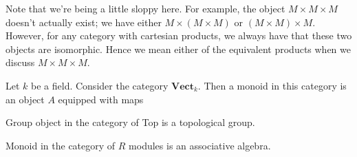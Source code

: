 \textcolor{NavyBlue}{Note that we're being a little sloppy here. For example, the object 
$M \times M \times M$ doesn't actually exist; we have either $M \times (M \times M)$ or $(M \times M) \times M$. 
} However, for any category with cartesian products, we always have that these two objects 
are isomorphic. Hence we mean either of the equivalent products when we discuss $M \times M \times M$. 

\begin{example}
    Let $k$ be a field. Consider the category $\textbf{Vect}_k$. Then a monoid 
    in this category is an object $A$ equipped with maps 
\end{example}

\begin{example}
    Group object in the category of Top is a topological group.
\end{example}

\begin{example}
    Monoid in the category of $R$ modules is an associative algebra.
\end{example}
